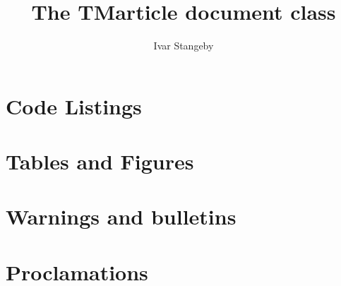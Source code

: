 \documentclass{TMarticle}
\author{Ivar Stangeby}
\title{The TMarticle document class}
\begin{document}
\maketitle
\section{Code Listings}

\section{Tables and Figures}
\section{Warnings and bulletins}
\section{Proclamations}
\end{document}
